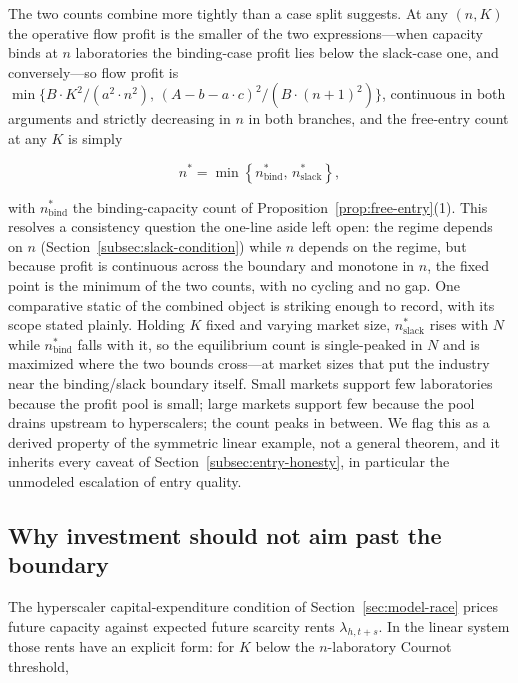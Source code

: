 \documentclass[11pt]{article}
\begin{document}
The two counts combine more tightly than a case split suggests. At any $(n,K)$ the operative flow profit is the smaller of the two expressions---when capacity binds at $n$ laboratories the binding-case profit lies below the slack-case one, and conversely---so flow profit is $\min\{B\cdot K^{2}/(a^{2}\cdot n^{2}),\,(A-b-a\cdot c)^{2}/(B\cdot(n+1)^{2})\}$, continuous in both arguments and strictly decreasing in $n$ in both branches, and the free-entry count at any $K$ is simply

\begin{equation}n^{*}=\min\left\{n^{*}_{\mathrm{bind}},\,n^{*}_{\mathrm{slack}}\right\},\end{equation}

with $n^{*}_{\mathrm{bind}}$ the binding-capacity count of Proposition~\ref{prop:free-entry}(1). This resolves a consistency question the one-line aside left open: the regime depends on $n$ (Section~\ref{subsec:slack-condition}) while $n$ depends on the regime, but because profit is continuous across the boundary and monotone in $n$, the fixed point is the minimum of the two counts, with no cycling and no gap. One comparative static of the combined object is striking enough to record, with its scope stated plainly. Holding $K$ fixed and varying market size, $n^{*}_{\mathrm{slack}}$ rises with $N$ while $n^{*}_{\mathrm{bind}}$ falls with it, so the equilibrium count is single-peaked in $N$ and is maximized where the two bounds cross---at market sizes that put the industry near the binding/slack boundary itself. Small markets support few laboratories because the profit pool is small; large markets support few because the pool drains upstream to hyperscalers; the count peaks in between. We flag this as a derived property of the symmetric linear example, not a general theorem, and it inherits every caveat of Section~\ref{subsec:entry-honesty}, in particular the unmodeled escalation of entry quality.

\subsection{Why investment should not aim past the boundary}
\label{subsec:slack-investment}

The hyperscaler capital-expenditure condition of Section~\ref{sec:model-race} prices future capacity against expected future scarcity rents $\lambda_{h,t+s}$. In the linear system those rents have an explicit form: for $K$ below the $n$-laboratory Cournot threshold,
\end{document}

